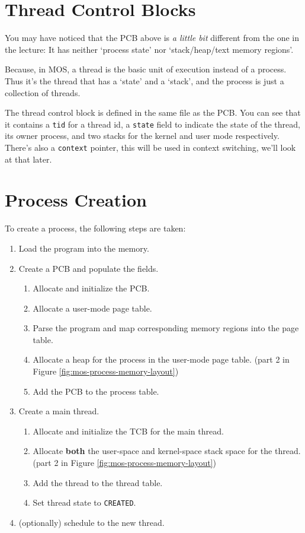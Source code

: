 \section{Thread Control Blocks}

You may have noticed that the PCB above is \textit{a little bit} different from the one in the
lecture: It has neither `process state' nor `stack/heap/text memory regions'.

Because, in MOS, a thread is the basic unit of execution instead of a process. Thus it's the thread that has a
`state' and a `stack', and the process is just a collection of threads.

The thread control block is defined in the same file as the PCB. You can see that it contains
a \texttt{tid} for a thread id, a \texttt{state} field to indicate the state of the thread,
its owner process, and two stacks for the kernel and user mode respectively. There's also a
\texttt{context} pointer, this will be used in context switching, we'll look at that later.

\section{Process Creation}

To create a process, the following steps are taken:

\begin{enumerate}
    \item Load the program into the memory.
    \item Create a PCB and populate the fields.
          \begin{enumerate}
              \item Allocate and initialize the PCB.
              \item Allocate a user-mode page table.
              \item Parse the program and map corresponding memory regions into the page table.
              \item Allocate a heap for the process in the user-mode page table.
                    (part 2 in Figure \ref{fig:mos-process-memory-layout})
              \item Add the PCB to the process table.
          \end{enumerate}
    \item Create a main thread.
          \begin{enumerate}
              \item Allocate and initialize the TCB for the main thread.
              \item Allocate \textbf{both} the user-space and kernel-space stack space for the thread.
                    (part 2 in Figure \ref{fig:mos-process-memory-layout})
              \item Add the thread to the thread table.
              \item Set thread state to \texttt{CREATED}.
          \end{enumerate}
    \item (optionally) schedule to the new thread.
\end{enumerate}

